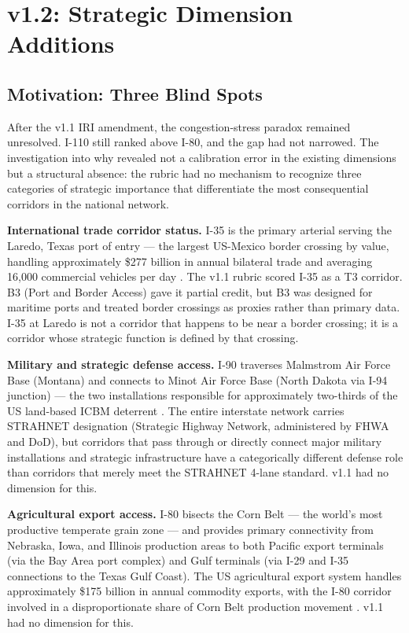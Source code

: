 \section{v1.2: Strategic Dimension Additions}
\label{sec:v12-additions}

\subsection{Motivation: Three Blind Spots}

After the v1.1 IRI amendment, the congestion-stress paradox remained unresolved. I-110 still ranked above I-80, and the gap had not narrowed. The investigation into why revealed not a calibration error in the existing dimensions but a structural absence: the rubric had no mechanism to recognize three categories of strategic importance that differentiate the most consequential corridors in the national network.

\textbf{International trade corridor status.} I-35 is the primary arterial serving the Laredo, Texas port of entry --- the largest US-Mexico border crossing by value, handling approximately \$277 billion in annual bilateral trade and averaging 16,000 commercial vehicles per day \citep{FHWA_freight2023}. The v1.1 rubric scored I-35 as a T3 corridor. B3 (Port and Border Access) gave it partial credit, but B3 was designed for maritime ports and treated border crossings as proxies rather than primary data. I-35 at Laredo is not a corridor that happens to be near a border crossing; it is a corridor whose strategic function is defined by that crossing.

\textbf{Military and strategic defense access.} I-90 traverses Malmstrom Air Force Base (Montana) and connects to Minot Air Force Base (North Dakota via I-94 junction) --- the two installations responsible for approximately two-thirds of the US land-based ICBM deterrent \citep{DOD_STRAHNET}. The entire interstate network carries STRAHNET designation (Strategic Highway Network, administered by FHWA and DoD), but corridors that pass through or directly connect major military installations and strategic infrastructure have a categorically different defense role than corridors that merely meet the STRAHNET 4-lane standard. v1.1 had no dimension for this.

\textbf{Agricultural export access.} I-80 bisects the Corn Belt --- the world's most productive temperate grain zone --- and provides primary connectivity from Nebraska, Iowa, and Illinois production areas to both Pacific export terminals (via the Bay Area port complex) and Gulf terminals (via I-29 and I-35 connections to the Texas Gulf Coast). The US agricultural export system handles approximately \$175 billion in annual commodity exports, with the I-80 corridor involved in a disproportionate share of Corn Belt production movement \citep{FHWA_freight2023}. v1.1 had no dimension for this.

